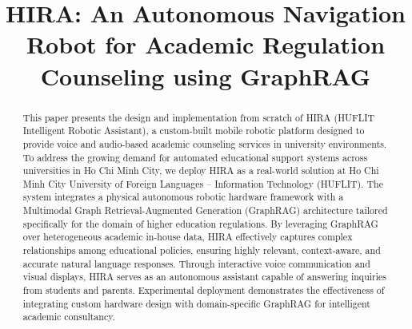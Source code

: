 \documentclass[conference]{IEEEtran}
\begin{document}
\title{HIRA: An Autonomous Navigation Robot for Academic Regulation Counseling using GraphRAG}

\author{

}

\maketitle
\raggedbottom

\begin{abstract}
    This paper presents the design and implementation from scratch of HIRA (HUFLIT Intelligent Robotic Assistant), a custom-built mobile robotic platform designed to provide voice and audio-based academic counseling services in university environments. To address the growing demand for automated educational support systems across universities in Ho Chi Minh City, we deploy HIRA as a real-world solution at Ho Chi Minh City University of Foreign Languages – Information Technology (HUFLIT). The system integrates a physical autonomous robotic hardware framework with a Multimodal Graph Retrieval-Augmented Generation (GraphRAG) architecture tailored specifically for the domain of higher education regulations. By leveraging GraphRAG over heterogeneous academic in-house data, HIRA effectively captures complex relationships among educational policies, ensuring highly relevant, context-aware, and accurate natural language responses. Through interactive voice communication and visual displays, HIRA serves as an autonomous assistant capable of answering inquiries from students and parents. Experimental deployment demonstrates the effectiveness of integrating custom hardware design with domain-specific GraphRAG for intelligent academic consultancy.
\end{abstract}
\end{document}
